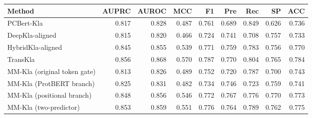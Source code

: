 \begin{tabular}{lrrrrrrrr}\toprule
Method & AUPRC & AUROC & MCC & F1 & Pre & Rec & SP & ACC\\\midrule
PCBert-Kla & 0.817 & 0.828 & 0.487 & 0.761 & 0.689 & 0.849 & 0.626 & 0.736\\
DeepKla-aligned & 0.815 & 0.820 & 0.466 & 0.724 & 0.741 & 0.708 & 0.757 & 0.733\\
HybridKla-aligned & 0.845 & 0.855 & 0.539 & 0.771 & 0.759 & 0.783 & 0.756 & 0.770\\
TransKla & 0.856 & 0.868 & 0.570 & 0.787 & 0.770 & 0.804 & 0.765 & 0.784\\
MM-Kla (original token gate) & 0.813 & 0.826 & 0.489 & 0.752 & 0.720 & 0.787 & 0.700 & 0.743\\
MM-Kla (ProtBERT branch) & 0.825 & 0.831 & 0.482 & 0.734 & 0.746 & 0.723 & 0.759 & 0.741\\
MM-Kla (positional branch) & 0.848 & 0.856 & 0.546 & 0.772 & 0.767 & 0.776 & 0.770 & 0.773\\
MM-Kla (two-predictor) & 0.853 & 0.859 & 0.551 & 0.776 & 0.764 & 0.789 & 0.762 & 0.775\\
\bottomrule\end{tabular}
